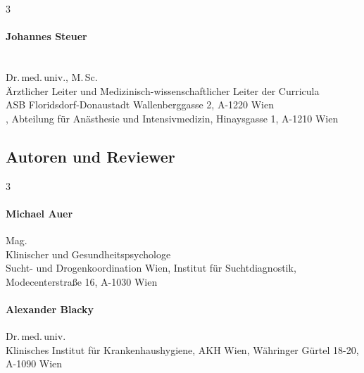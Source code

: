\begin{WidePar}
\begin{raggedright}
\begin{multicols}{3}
  \bigskip

  \begin{minipage}{\linewidth}\raggedright
    \paragraph{Johannes Steuer}~~\\
    Dr.\,med.\,univ., M.\,Sc.
    \\[.25\baselineskip]
    \noindent{}Ärztlicher Leiter und Medizinisch-wissenschaftlicher Leiter der
    Curricula\\
    {\color{AltBlueDark}ASB Florids\-dorf-Donau\-stadt}
    Wallenberggasse 2, A-1220 Wien
    \\[.25\baselineskip]
    , Abteilung für Anästhesie und
    Intensivmedizin, Hinaysgasse 1, A-1210 Wien
  \end{minipage}




\end{multicols}


\subsection*{Autoren und Reviewer}


\begin{multicols}{3}\FontSansNarrowFamily\small
  \begin{minipage}{\linewidth}\raggedright
    \paragraph{Michael Auer}
    Mag.\\[.25\baselineskip]
    Klinischer und Gesundheitspsychologe\\[.25\baselineskip]
    {\color{AltBlueDark}Sucht- und Drogenkoordination Wien, Institut für
    Suchtdiagnostik}, Modecenterstraße 16, A-1030 Wien
  \end{minipage}

  \bigskip

  \begin{minipage}{\linewidth}\raggedright
    \paragraph{Alexander Blacky}
    Dr.\,med.\,univ.\\[.25\baselineskip]
    {\color{AltBlueDark}Klinisches Institut für Krankenhaushygiene, AKH
    Wien}, Währinger Gürtel 18-20, A-1090 Wien
  \end{minipage}


\end{multicols}
\end{raggedright}
\end{WidePar}
